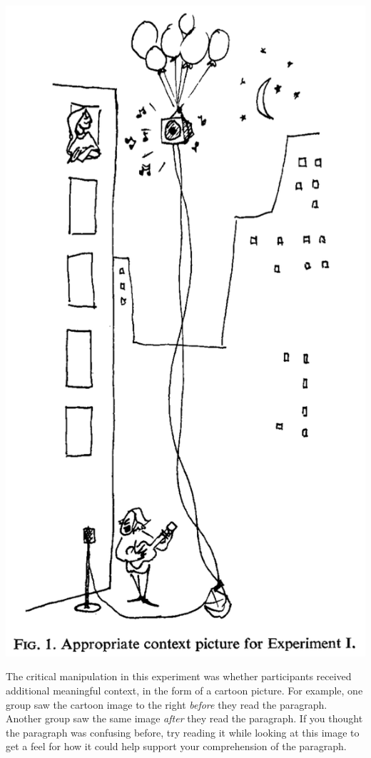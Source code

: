 \documentclass[
  oneside,
  12pt]{crumpbook}
\newenvironment{floatright25}{%
  \wrapfigure{R}{.25\textwidth}%
  }{%
  \endwrapfigure}
\begin{document}
\begin{floatright25}
\includegraphics[width=1\linewidth]{imgs/Bransford_context}

\end{floatright25}

The critical manipulation in this experiment was whether participants received additional meaningful context, in the form of a cartoon picture. For example, one group saw the cartoon image to the right \emph{before} they read the paragraph. Another group saw the same image \emph{after} they read the paragraph. If you thought the paragraph was confusing before, try reading it while looking at this image to get a feel for how it could help support your comprehension of the paragraph.
\end{document}
